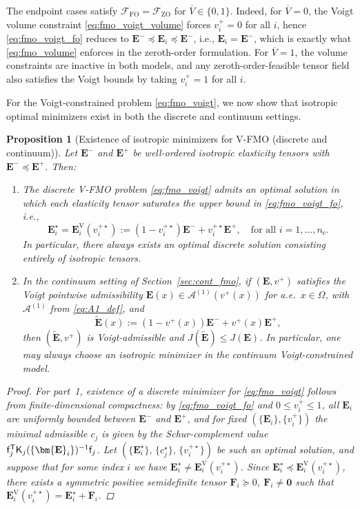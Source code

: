 \documentclass[preprint,3p]{elsarticle}
\newcommand{\tens}[1]{\bm{\mathit{#1}}}             %
\newcommand{\tensf}[1]{\bm{\mathbf{#1}}}            %
\newcommand{\trn}{\mathsf{T}}                       %
\newcommand{\Ei}{\tensf{E}_i}                       %
\newcommand{\EVs}{\tensf{E}_i^{\mathrm{V}}(v_i^{+\star})}   %
\newcommand{\Emin}{\tensf{E}^{-}}                   %
\newcommand{\Emax}{\tensf{E}^{+}}                   %
\newcommand{\nel}{n_\mathrm{e}}                     %
\newcommand{\semtrx}[1]{\ifcat\noexpand#1\relax\bm{#1}\else\mathsf{#1}\fi}
\newcommand{\sevek}[1]{\ifcat\noexpand#1\relax\bm{#1}\else\mathsf{#1}\fi}
\newtheorem{proposition}{Proposition}[section]
\begin{document}
The endpoint cases satisfy $\mathcal F_{\mathrm{FO}}=\mathcal F_{\mathrm{ZO}}$ for $\overline{V}\in\{0,1\}$. Indeed, for $\overline{V}=0$, the Voigt volume constraint \eqref{eq:fmo_voigt_volume} forces $v_i^+=0$ for all $i$, hence \eqref{eq:fmo_voigt_fo} reduces to $\Emin\preceq\Ei\preceq\Emin$, i.e., $\Ei=\Emin$, which is exactly what \eqref{eq:fmo_volume} enforces in the zeroth-order formulation. For $\overline{V}=1$, the volume constraints are inactive in both models, and any zeroth-order-feasible tensor field also satisfies the Voigt bounds by taking $v_i^+=1$ for all $i$.

For the Voigt-constrained problem \eqref{eq:fmo_voigt}, we now show that isotropic optimal minimizers exist in both the discrete and continuum settings.

\begin{proposition}[Existence of isotropic minimizers for V-FMO (discrete and continuum)]\label{prop:voigt_iso}
Let $\Emin$ and $\Emax$ be well-ordered isotropic elasticity tensors with $\Emin \preceq \Emax$. Then:
\begin{enumerate}
    \item The discrete V-FMO problem \eqref{eq:fmo_voigt} admits an optimal solution in which each elasticity tensor saturates the upper bound in \eqref{eq:fmo_voigt_fo}, i.e.,
    \[
        \Ei^\star = \EVs := (1 - v_i^{+\star}) \Emin + v_i^{+\star} \Emax, \quad \text{for all } i = 1,\dots,\nel.
    \]
    In particular, there always exists an optimal discrete solution consisting entirely of isotropic tensors.
    \item In the continuum setting of Section~\ref{sec:cont_fmo}, if $(\tensf E,v^+)$ satisfies the Voigt pointwise admissibility $\tensf E(\tens x)\in \mathcal A^{(1)}(v^+(\tens x))$ for a.e.\ $\tens x\in\Omega$, with $\mathcal A^{(1)}$ from \eqref{eq:A1_def}, and
    \[
        \widetilde{\tensf E}(\tens x):=(1-v^+(\tens x))\Emin+v^+(\tens x)\Emax,
    \]
    then $(\widetilde{\tensf E},v^+)$ is Voigt-admissible and $J(\widetilde{\tensf E})\le J(\tensf E)$. In particular, one may always choose an isotropic minimizer in the continuum Voigt-constrained model.
\end{enumerate}
\begin{proof}
For part~1, existence of a discrete minimizer for \eqref{eq:fmo_voigt} follows from finite-dimensional compactness: by \eqref{eq:fmo_voigt_fo} and $0\le v_i^+\le1$, all $\Ei$ are uniformly bounded between $\Emin$ and $\Emax$, and for fixed $(\{\Ei\},\{v_i^+\})$ the minimal admissible $c_j$ is given by the Schur-complement value $\sevek{f}_j^\trn \semtrx K_j(\{\Ei\})^{-1}\sevek{f}_j$. Let $\left(\{\Ei^\star\},\, \{c_j^\star\},\, \{v_i^{+\star}\}\right)$ be such an optimal solution, and suppose that for some index $i$ we have $\Ei^\star \neq \EVs$. Since $\Ei^\star \preceq \EVs$, there exists a symmetric positive semidefinite tensor $\tensf{F}_i \succeq 0$, $\tensf{F}_i \neq \tensf{0}$ such that $\EVs = \Ei^\star + \tensf{F}_i$.


\end{proof}
\end{proposition}
\end{document}

